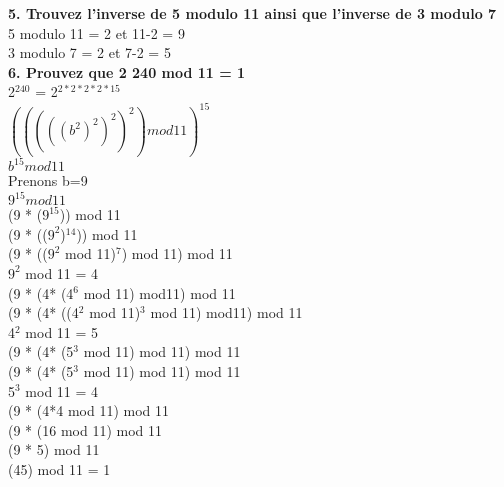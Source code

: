 \textbf{5. Trouvez l’inverse de 5 modulo 11 ainsi que l’inverse de 3 modulo 7} \\

5 modulo 11 = 2 et 11-2 = 9 \\

3 modulo 7 = 2 et 7-2 = 5 \\

\newpage
\textbf{6. Prouvez que 2 240 mod 11 = 1} \\

2$^{240}$ = 2$^{2*2*2*2*15}$ \\

$(((((b^{2})^{2})^{2})^{2}) mod 11)^{15}$ \\

$b^{15} mod 11$ \\

Prenons b=9 \\

$9^{15} mod 11$ \\

(9 * ($9^{15}$)) mod 11 \\

(9 * (($9^{2}$)$^{14}$)) mod 11 \\

(9 * (($9^{2}$ mod 11)$^{7}$) mod 11) mod 11 \\

$9^{2}$ mod 11 = 4 \\

(9 * (4* (4$^{6}$ mod 11) mod11) mod 11 \\

(9 * (4* ((4$^{2}$ mod 11)$^{3}$ mod 11) mod11) mod 11 \\

4$^{2}$ mod 11 = 5 \\

(9 * (4* (5$^{3}$ mod 11) mod 11) mod 11 \\

(9 * (4* (5$^{3}$ mod 11) mod 11) mod 11 \\

5$^{3}$ mod 11 = 4 \\

(9 * (4*4 mod 11) mod 11 \\

(9 * (16 mod 11) mod 11 \\

(9 * 5) mod 11 \\

(45) mod 11 = 1 \\
